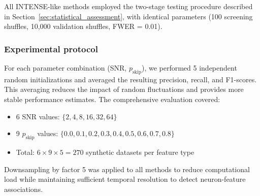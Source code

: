 All INTENSE-like methods employed the two-stage testing procedure described in
Section~\ref{sec:statistical_assessment}, with identical parameters (100 screening
shuffles, 10,000 validation shuffles, FWER = 0.01).

\subsubsection{Experimental protocol}
\label{sec:experimental_protocol}

For each parameter combination (SNR, $p_{\text{skip}}$), we performed 5 independent
random initializations and averaged the resulting precision, recall, and F1-scores.
This averaging reduces the impact of random fluctuations and provides more stable
performance estimates. The comprehensive evaluation covered:
\begin{itemize}
\item 6 SNR values: $\{2, 4, 8, 16, 32, 64\}$
\item 9 $p_{\text{skip}}$ values: $\{0.0, 0.1, 0.2, 0.3, 0.4, 0.5, 0.6, 0.7, 0.8\}$
\item Total: $6 \times 9 \times 5 = 270$ synthetic datasets per feature type
\end{itemize}

Downsampling by factor 5 was applied to all methods to reduce computational load
while maintaining sufficient temporal resolution to detect neuron-feature
associations.

